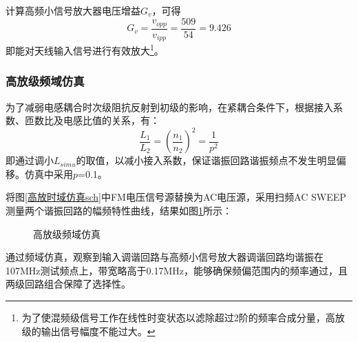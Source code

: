 \documentclass[a4paper,12pt,twoside]{article}
\begin{document}
计算高频小信号放大器电压增益$G_v$，可得
$$
G_v=\frac{v_{opp}}{v_{ipp}}=\frac{509}{54}=9.426
$$
即能对天线输入信号进行有效放大\footnote{为了使混频级信号工作在线性时变状态以滤除超过2阶的频率合成分量，高放级的输出信号幅度不能过大。}。

\subsubsection{高放级频域仿真}
为了减弱电感耦合时次级阻抗反射到初级的影响，在紧耦合条件下，根据接入系数、匝数比及电感比值的关系，有：
\begin{equation}
    \frac{L_1}{L_2}=(\frac{n_1}{n_2})^2=\frac{1}{p^2}
\end{equation}
即通过调小$L_{simu}$的取值，以减小接入系数，保证谐振回路谐振频点不发生明显偏移\cite{杨文娟2020电力电子变压器中高频变压器的设计方法}。仿真中采用$p$=0.1。


将图\ref{高放时域仿真sch}中FM电压信号源替换为AC电压源，采用扫频AC SWEEP测量两个谐振回路的幅频特性曲线，结果如图\ref{高放频域wave}所示：

\begin{figure}[H]
    \centering
     \hspace{0.01\linewidth}
    \caption{高放级频域仿真}
  \label{高放频域wave}
\end{figure}
通过频域仿真，观察到输入调谐回路与高频小信号放大器调谐回路均谐振在107MHz测试频点上，带宽略高于0.17MHz，能够确保频偏范围内的频率通过，且两级回路组合保障了选择性。
\end{document}
